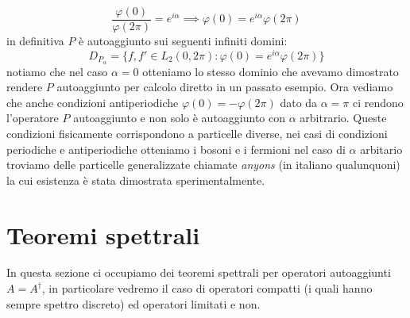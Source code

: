 \documentclass[12pt]{book}
\theoremstyle{plain}
\theoremstyle{definition}
\theoremstyle{remark}
\begin{document}
\[\frac{\varphi(0)}{\varphi(2\pi)} = e^{i\alpha} \implies \varphi(0) = e^{i\alpha} \varphi(2\pi)\]
in definitiva $P$ è autoaggiunto sui seguenti infiniti domini:
\[D_{P_\alpha} = \{f,f'\in L_2(0,2\pi):\varphi(0) = e^{i\alpha} \varphi(2\pi) \}\]
notiamo che nel caso $\alpha=0$ otteniamo lo stesso dominio che avevamo dimostrato rendere $P$ autoaggiunto per calcolo diretto in un passato esempio. Ora vediamo che anche condizioni antiperiodiche $\varphi(0)=-\varphi(2\pi)$ dato da $\alpha = \pi$ ci rendono l'operatore $P$ autoaggiunto e non solo è autoaggiunto con $\alpha$ arbitrario. Queste condizioni fisicamente corrispondono a particelle diverse, nei casi di condizioni periodiche e antiperiodiche otteniamo i bosoni e i fermioni nel caso di $\alpha$ arbitario troviamo delle particelle generalizzate chiamate \emph{anyons} (in italiano qualunquoni) la cui esistenza è stata dimostrata sperimentalmente.
\section{Teoremi spettrali}
In questa sezione ci occupiamo dei teoremi spettrali per operatori autoaggiunti $A=A^\dagger$, in particolare vedremo il caso di operatori compatti (i quali hanno sempre spettro discreto) ed operatori limitati e non. 
\end{document}
